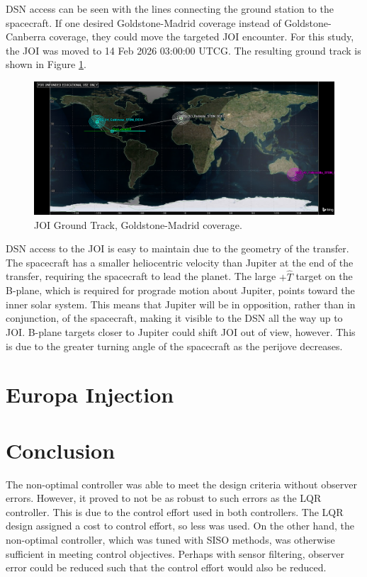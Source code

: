 \documentclass[]{aiaa-tc}%
\begin{document}
DSN access can be seen with the lines connecting the ground station to the spacecraft. If one desired Goldstone-Madrid coverage instead of Goldstone-Canberra coverage, they could move the targeted JOI encounter. For this study, the JOI was moved to 14 Feb 2026 03:00:00 UTCG. The resulting ground track is shown in Figure \ref{fig:newJOI_GroundTrack}.
	\begin{figure}[H]
		\centering
			\includegraphics[width = 16cm]{../Figures/newJOI_GroundTrack.png}
		\caption{JOI Ground Track, Goldstone-Madrid coverage. }
		\label{fig:newJOI_GroundTrack}
	\end{figure}	

DSN access to the JOI is easy to maintain due to the geometry of the transfer. The spacecraft has a smaller heliocentric velocity than Jupiter at the end of the transfer, requiring the spacecraft to lead the planet. The large $+\hat{T}$ target on the B-plane, which is required for prograde motion about Jupiter, points toward the inner solar system. This means that Jupiter will be in opposition, rather than in conjunction, of the spacecraft, making it visible to the DSN all the way up to JOI.  B-plane targets closer to Jupiter could shift JOI out of view, however. This is due to the greater turning angle of the spacecraft as the perijove decreases.

	\section{Europa Injection}

	\section{Conclusion}

	The non-optimal controller was able to meet the design criteria without observer errors. However, it proved to not be as robust to such errors as the LQR controller. This is due to the control effort used in both controllers. The LQR design assigned a cost to control effort, so less was used. On the other hand, the non-optimal controller, which was tuned with SISO methods, was otherwise sufficient in meeting control objectives. Perhaps with sensor filtering, observer error could be reduced such that the control effort would also be reduced. 
\end{document}

